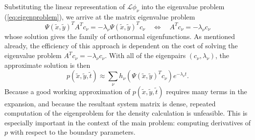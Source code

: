 Substituting the linear representation
of $\mathcal{L}\phi_\nu$ into the eigenvalue problem
(\ref{eq:eigenproblem}), we arrive at the matrix eigenvalue problem
\[
  \Psi(\tilde{x},\tilde{y})^T A^T c_\nu = -\lambda_\nu \Psi(\tilde{x},\tilde{y})^T c_\nu
  \quad \Leftrightarrow \quad A^T c_\nu = -\lambda_\nu c_\nu
\]
whose solution gives the family of orthonormal eigenfunctions. As
mentioned already, the efficiency of this approach is dependent on the
cost of solving the eigenvalue problem
$A^T c_\nu = -\lambda_\nu c_\nu$. With all of the eigenpairs
$(c_\nu, \lambda_\nu)$, the approximate solution is then
\[
  p(\tilde{x},\tilde{y},\tilde{t}) \approx \sum_{\nu} h_\nu
  \left(\Psi(\tilde{x},\tilde{y})^Tc_\nu\right) e^{-\lambda_\nu t}.
\]
Because a good working approximation of
$p(\tilde{x},\tilde{y},\tilde{t})$ requires many terms in the
expansion, and because the resultant system matrix is dense, repeated
computation of the eigenproblem for the density calculation is
unfeasible. This is especially important in the context of the main
problem: computing derivatives of $p$ with respect to the boundary
parameters.

